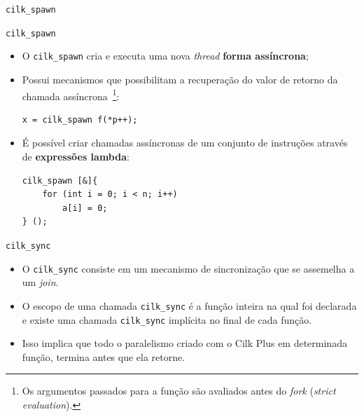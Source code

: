 \documentclass{beamer}
\begin{document}
{%
\begin{frame}{\texttt{cilk\_spawn}}
\end{frame}
}

\begin{frame}[fragile]{\texttt{cilk\_spawn}}
\begin{itemize}
    \item O \texttt{cilk\_spawn} cria e executa uma nova \textit{thread}
    \textbf{forma assíncrona};
    \item Possui mecanismos que possibilitam a recuperação do valor de retorno
    da chamada assíncrona~\footnote{Os argumentos passados para a função são
    avaliados antes do \textit{fork} (\textit{strict evaluation}).}:
\begin{lstlisting}
x = cilk_spawn f(*p++);
\end{lstlisting}
    \item É possível criar chamadas assíncronas de um conjunto de instruções
    através de \textbf{expressões lambda}:
\begin{lstlisting}
cilk_spawn [&]{
    for (int i = 0; i < n; i++)
        a[i] = 0;
} ();
\end{lstlisting}
\end{itemize}
\end{frame}

\begin{frame}{\texttt{cilk\_sync}}
\begin{itemize}
    \item O \texttt{cilk\_sync} consiste em um mecanismo de sincronização que se
    assemelha a um \textit{join}.
    \item O escopo de uma chamada \texttt{cilk\_sync} é a função inteira na qual
    foi declarada e existe uma chamada \texttt{cilk\_sync} implícita no final de
    cada função.
    \item Isso implica que todo o paralelismo criado com o Cilk Plus em
    determinada função, termina antes que ela retorne.
\end{itemize}
\end{frame}
\end{document}
